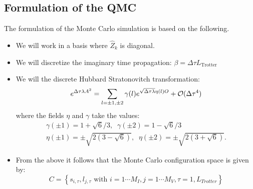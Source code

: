 \subsection{Formulation of the QMC}  
The formulation of the  Monte Carlo simulation is based on the following.
\begin{itemize}
\item  We will work in  a basis  where  $\hat{Z}_k$ is diagonal. 
\item  We will discretize the imaginary time propagation: $\beta = \Delta \tau L_{\text{Trotter}} $
\item  We will the   discrete Hubbard Stratonovitch transformation: 
\begin{equation}
\label{HS_squares}
        e^{\Delta \tau  \lambda  A^2 } =
        \sum_{ l = \pm 1, \pm 2}  \gamma(l)
e^{ \sqrt{\Delta \tau \lambda }
       \eta(l)  O }
                + {\cal O} (\Delta \tau ^4)
\end{equation}
where the fields $\eta$ and $\gamma$ take the values:
\begin{eqnarray}
 \gamma(\pm 1) = 1 + \sqrt{6}/3, \; \; \gamma(\pm 2) = 1 - \sqrt{6}/3
\nonumber \\
 \eta(\pm 1 ) = \pm \sqrt{2 \left(3 - \sqrt{6} \right)},  \; \;
 \eta(\pm 2 ) = \pm \sqrt{2 \left(3 + \sqrt{6} \right)}.
\nonumber
\end{eqnarray}
\item From the above it follows that   the Monte Carlo configuration space is given by: 
\begin{equation}
	C = \left\{   s_{i,\tau} ,  l_{j,\tau}  \text{ with }  i=1\cdots M_I,  j = 1\cdots M_V,  \tau=1,L_{Trotter}  \right\}
\end{equation}
\end{itemize}

